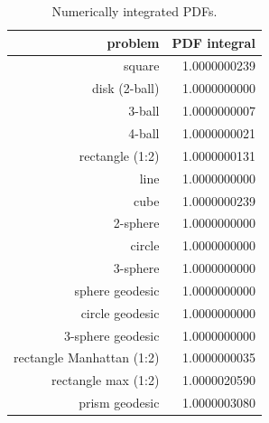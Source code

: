 \begin{table}[ht]
  \centering
  \begin{tabular}{r|r}
                  problem & PDF integral \\
     \hline 
                   square & 1.0000000239 \\
            disk (2-ball) & 1.0000000000 \\
                   3-ball & 1.0000000007 \\
                   4-ball & 1.0000000021 \\
          rectangle (1:2) & 1.0000000131 \\
                     line & 1.0000000000 \\
                     cube & 1.0000000239 \\
                 2-sphere & 1.0000000000 \\
                   circle & 1.0000000000 \\
                 3-sphere & 1.0000000000 \\
          sphere geodesic & 1.0000000000 \\
          circle geodesic & 1.0000000000 \\
        3-sphere geodesic & 1.0000000000 \\
rectangle Manhattan (1:2) & 1.0000000035 \\
      rectangle max (1:2) & 1.0000020590 \\
           prism geodesic & 1.0000003080 \\
  \end{tabular}
  \caption{Numerically integrated PDFs.}
  \label{tab:numerical_pdf_sum}
\end{table}
